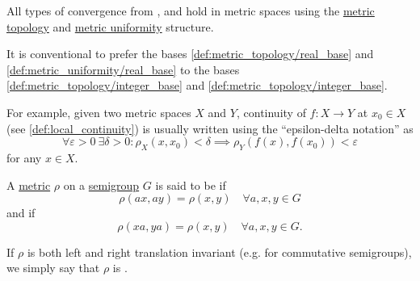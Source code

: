 \begin{remark}\label{rem:metric_space_convergence}
  All types of convergence from ,  and  hold in metric spaces using the \hyperref[def:metric_topology]{metric topology} and \hyperref[def:metric_uniformity]{metric uniformity} structure.

  It is conventional to prefer the bases \cref{def:metric_topology/real_base} and \cref{def:metric_uniformity/real_base} to the bases \cref{def:metric_topology/integer_base} and \cref{def:metric_topology/integer_base}.

  For example, given two metric spaces \( X \) and \( Y \), continuity of \( f: X \to Y \) at \( x_0 \in X \) (see \cref{def:local_continuity}) is usually written using the \enquote{epsilon-delta notation} as
  \begin{equation*}
    \forall \varepsilon > 0 \ \exists \delta > 0 : \rho_X(x, x_0) < \delta \implies \rho_Y(f(x), f(x_0)) < \varepsilon
  \end{equation*}
  for any \( x \in X \).
\end{remark}

\begin{definition}\label{def:translation_invariant_metric}
  A \hyperref[def:metric_space]{metric} \( \rho \) on a \hyperref[def:semigroup]{semigroup} \( G \) is said to be  if
  \begin{equation*}
    \rho(ax, ay) = \rho(x, y) \quad\forall a, x, y \in G
  \end{equation*}
  and  if
  \begin{equation*}
    \rho(xa, ya) = \rho(x, y) \quad\forall a, x, y \in G.
  \end{equation*}

  If \( \rho \) is both left and right translation invariant (e.g. for commutative semigroups), we simply say that \( \rho \) is .
\end{definition}
